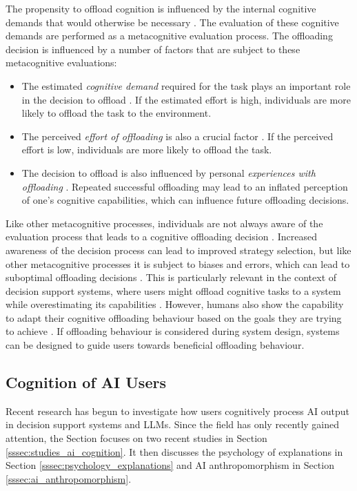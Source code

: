 The propensity to offload cognition is influenced by the internal cognitive demands that would otherwise be necessary \parencite{Gilbert2015, Risko2015}. The evaluation of these cognitive demands are performed as a metacognitive evaluation process. The offloading decision is influenced by a number of factors that are subject to these metacognitive evaluations:

\begin{itemize}
    \item The estimated \textit{cognitive demand} required for the task plays an important role in the decision to offload \parencite{Risko2015}. If the estimated effort is high, individuals are more likely to offload the task to the environment.
    \item The perceived \textit{effort of offloading} is also a crucial factor \parencite{Risko2015}. If the perceived effort is low, individuals are more likely to offload the task.
    \item The decision to offload is also influenced by personal \textit{experiences with offloading} \parencite{Ward2013}. Repeated successful offloading may lead to an inflated perception of one's cognitive capabilities, which can influence future offloading decisions.
\end{itemize}

Like other metacognitive processes, individuals are not always aware of the evaluation process that leads to a cognitive offloading decision \parencite{Schunn2001}. Increased awareness of the decision process can lead to improved strategy selection, but like other metacognitive processes it is subject to biases and errors, which can lead to suboptimal offloading decisions \parencite{Risko2015}. This is particularly relevant in the context of decision support systems, where users might offload cognitive tasks to a system while overestimating its capabilities \parencite{Jussupow2021}. However, humans also show the capability to adapt their cognitive offloading behaviour based on the goals they are trying to achieve \parencite{Weis2019}. If offloading behaviour is considered during system design, systems can be designed to guide users towards beneficial offloading behaviour.

\subsection{Cognition of AI Users} \label{ssec:cognition_ai_users}

Recent research has begun to investigate how users cognitively process \ac{AI} output in decision support systems and \acp{LLM}. Since the field has only recently gained attention, the Section focuses on two recent studies in Section \ref{sssec:studies_ai_cognition}. It then discusses the psychology of explanations in Section \ref{sssec:psychology_explanations} and AI anthropomorphism in Section \ref{sssec:ai_anthropomorphism}.

